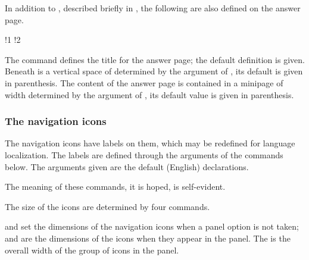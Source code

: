 \documentclass{article}
\begin{document}
In addition to , described briefly in , the following are also defined
on the answer page.
\bVerb{}%
\edef\x{\the\wd\webtempboxi}%
\def\1{\hbox to0pt{\hskip\x\relax\quad\normalfont(\texttt{.25in})\hss}}%
\def\2{\hbox to0pt{\hskip\x\relax\quad\normalfont(\texttt{.85\string\linewidth})\hss}}%
%
\begin{dCmd}[commandchars=!()]{\bxSize}
\renewcommand{\ecANS}{\textbf{ANSWER}}
!1
!2
\end{dCmd}
\eVerb The  command defines the title for the answer page;
the default definition is given. Beneath  is a vertical space
of  determined by the argument of , its
default is given in parenthesis. The content of the answer page is
contained in a minipage of width  determined by the argument of
, its default value is given in parenthesis.

\subsubsection{The navigation icons}

The navigation icons have labels on them, which may be redefined for language
localization. The labels are defined through the arguments of the commands
below. The arguments given are the default (English) declarations.

\bVerb{}%
\begin{dCmd}[commandchars=!()]{\bxSize}
        
        
        
        
    
    
\end{dCmd}
\eVerb The meaning of these commands, it is hoped, is self-evident.

The size of the icons are determined by four commands.
\bVerb\takeMeasure{\string\renewcommand\string\iconWidthPanel\darg{28pt}}%
\begin{dCmd}[commandchars=!()]{\bxSize}
\renewcommand\iconWidth{40pt}
\renewcommand\iconHeight{15pt}
\renewcommand\iconWidthPanel{28pt}
\renewcommand\panelGrpWidth{57pt}
\end{dCmd}
\bVerb {} and  set the dimensions of the
navigation icons when a panel option is not taken;  and
 are the dimensions of the icons when they appear in the panel.
The  is the overall width of the group of icons in the
panel.
\end{document}
